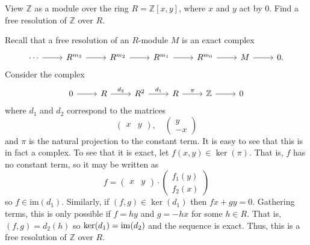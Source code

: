 \documentclass[../../master.tex]{subfiles}
\begin{document}
\begin{problem}
    View $\mathbb{Z}$ as a module over the ring $R = \mathbb{Z}[x, y]$, where $x$ and $y$ act by 0.
    Find a free resolution of $\mathbb{Z}$ over $R$.
\end{problem}

\begin{solution}
    Recall that a free resolution of an $R$-module $M$ is an exact complex
    \[
    \begin{tikzcd}
        \cdots & R^{m_3} & R^{m_2} & R^{m_1} & R^{m_0} & M & 0.
        \arrow[from=1-1, to=1-2] 
        \arrow[from=1-2, to=1-3] 
        \arrow[from=1-3, to=1-4] 
        \arrow[from=1-4, to=1-5] 
        \arrow[from=1-5, to=1-6] 
        \arrow[from=1-6, to=1-7] 
    \end{tikzcd}
    \]
    Consider the complex
    \[
    \begin{tikzcd}
        0 & R & R^2 & R & \mathbb{Z} & 0
        \arrow[from=1-1, to=1-2] 
        \arrow[from=1-2, to=1-3, "d_2"] 
        \arrow[from=1-3, to=1-4, "d_1"] 
        \arrow[from=1-4, to=1-5, "\pi"] 
        \arrow[from=1-5, to=1-6] 
    \end{tikzcd}
    \]
    where $d_1$ and $d_2$ correspond to the matrices
    \[
    \begin{pmatrix}
        x & y
    \end{pmatrix}, \quad
    \begin{pmatrix}
        y \\
        -x
    \end{pmatrix}
    \]
    and $\pi$ is the natural projection to the constant term.
    It is easy to see that this is in fact a complex.
    To see that it is exact, let $f(x, y) \in \ker(\pi)$.
    That is, $f$ has no constant term, so it may be written as
    \[
        f = 
        \begin{pmatrix}
            x & y
        \end{pmatrix} \cdot
        \begin{pmatrix}
            f_1(y) \\
            f_2(x)
        \end{pmatrix}
    \]
    so $f \in \text{im}(d_1)$.
    Similarly, if $(f, g) \in \ker(d_1)$ then $fx + gy = 0$.
    Gathering terms, this is only possible if $f = h y$ and $g = -h x$ for some $h \in R$.
    That is, $(f, g) = d_2(h)$ so $\ker(d_1) = \operatorname{im}(d_2)$ and the sequence is exact.
    Thus, this is a free resolution of $\mathbb{Z}$ over $R$.
\end{solution}
\end{document}
